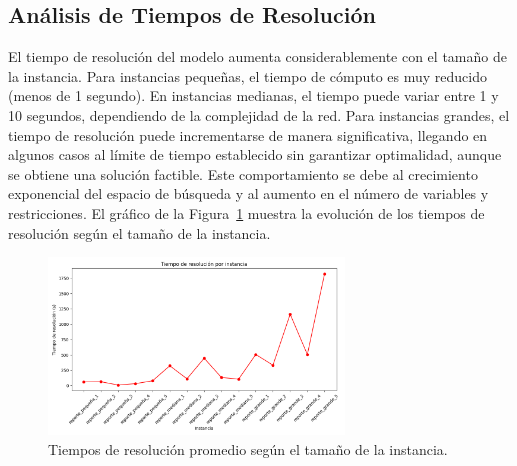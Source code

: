 \documentclass[a4paper,12pt]{article}
\begin{document}
\subsection{Análisis de Tiempos de Resolución}
El tiempo de resolución del modelo aumenta considerablemente con el tamaño de la instancia. Para instancias pequeñas, el tiempo de cómputo es muy reducido (menos de 1 segundo). En instancias medianas, el tiempo puede variar entre 1 y 10 segundos, dependiendo de la complejidad de la red. Para instancias grandes, el tiempo de resolución puede incrementarse de manera significativa, llegando en algunos casos al límite de tiempo establecido sin garantizar optimalidad, aunque se obtiene una solución factible. Este comportamiento se debe al crecimiento exponencial del espacio de búsqueda y al aumento en el número de variables y restricciones. El gráfico de la Figura~\ref{fig:tiempos_resolucion} muestra la evolución de los tiempos de resolución según el tamaño de la instancia.

\begin{figure}[H]
\centering
\includegraphics[width=0.7\textwidth]{tiempos_resolucion.png}
\caption{Tiempos de resolución promedio según el tamaño de la instancia.}
\label{fig:tiempos_resolucion}
\end{figure}

\end{document}
